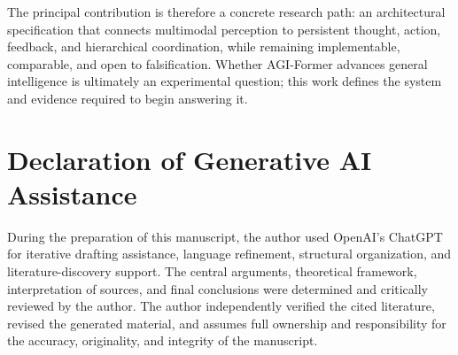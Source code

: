 The principal contribution is therefore a concrete research path: an architectural specification that connects multimodal perception to persistent thought, action, feedback, and hierarchical coordination, while remaining implementable, comparable, and open to falsification. Whether AGI-Former advances general intelligence is ultimately an experimental question; this work defines the system and evidence required to begin answering it.

\section*{Declaration of Generative AI Assistance}
During the preparation of this manuscript, the author used OpenAI's
ChatGPT for iterative drafting assistance, language refinement,
structural organization, and literature-discovery support. The central
arguments, theoretical framework, interpretation of sources, and final
conclusions were determined and critically reviewed by the author. The
author independently verified the cited literature, revised the
generated material, and assumes full ownership and responsibility for the accuracy,
originality, and integrity of the manuscript.